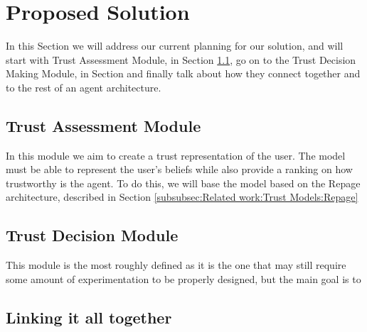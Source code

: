 \section{Proposed Solution}
\label{sec:Solution}
In this Section we will address our current planning for our solution, and will start with Trust Assessment Module, in Section \ref{subsec:Solution:Trust Assessment Module}, go on to the Trust Decision Making Module, in Section and finally talk about how they connect together and to the rest of an agent architecture.


\subsection{Trust Assessment Module}
\label{subsec:Solution:Trust Assessment Module}
In this module we aim to create a trust representation of the user. The model must be able to represent the user's beliefs while also provide a ranking on how trustworthy is the agent. To do this, we will base the model based on the Repage architecture, described in Section \ref{subsubsec:Related work:Trust Models:Repage}



\subsection{Trust Decision Module}
\label{subsec:Solution:Trust Decision Making Module}
This module is the most roughly defined as it is the one that may still require some amount of experimentation to be properly designed, but the main goal is to 


\subsection{Linking it all together}
\label{subsec:Solution:Linking all together}